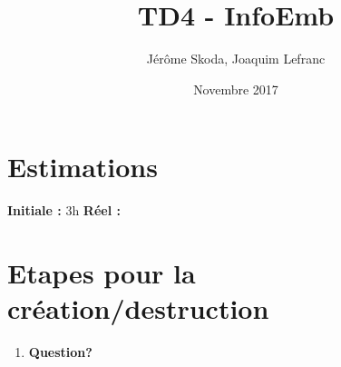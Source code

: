 \documentclass[12pt]{article}
\title{TD4 - InfoEmb}
\author{Jérôme Skoda, Joaquim Lefranc}
\date{Novembre 2017}
\begin{document}
\maketitle

\section{Estimations}
\textbf{Initiale :} 3h
\textbf{Réel :}

\section{Etapes pour la création/destruction}
\begin{enumerate}
	\item{\textbf{Question?}}
		\newline



\end{enumerate}
\end{document}

